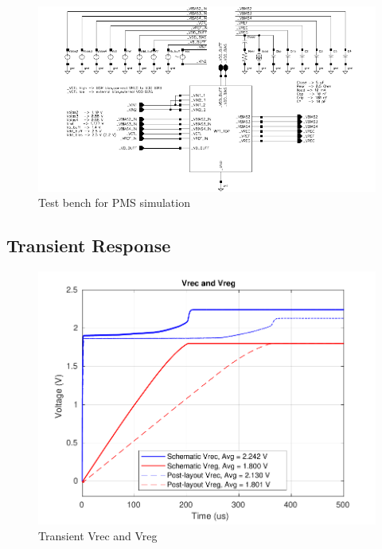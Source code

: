 \documentclass[UKenglish]{ifimaster}  %
\begin{document}
\vspace{5mm}

\begin{figure} [H]
  \centering
  \includegraphics[width=\textwidth]{img/wpt_top_testbench.pdf} 
 \caption{Test bench for PMS simulation } 
\label{fig:wpt_top_testbench} 
\end{figure}

\subsection{Transient Response}

\begin{figure} [H]
  \centering
  \includegraphics[width=\textwidth]{img/wpt_V_wo_bgr_both.pdf} 
 \caption{Transient Vrec and Vreg} 
\label{fig:wpt_V_wo} 
\end{figure}
\end{document}
